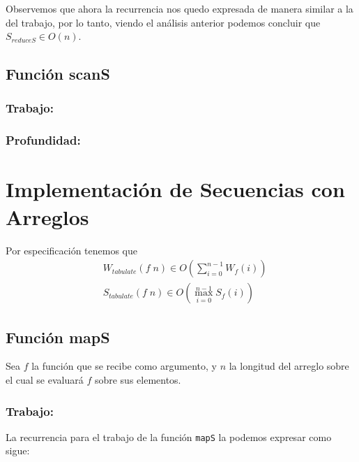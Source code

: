 \documentclass[11pt]{article}
\begin{document}
Observemos que ahora la recurrencia nos quedo expresada de manera similar
a la del trabajo, por lo tanto, viendo el análisis anterior podemos 
concluir que $S_{reduceS} \in O(n)$.


\subsection{Función scanS}
\subsubsection{Trabajo:}

\subsubsection{Profundidad:}


\section{Implementación de Secuencias con Arreglos}

Por especificación tenemos que
\begin{align*}
& W_{tabulate}(f \; n) \in O\left(\displaystyle\sum_{i=0}^{n - 1}W_f(i)\right) \\
& S_{tabulate}(f \; n) \in O\left(\displaystyle\max_{i=0}^{n - 1}S_f(i)\right)
\end{align*}

\subsection{Función mapS}

Sea $f$ la función que se recibe como argumento, y $n$ la longitud del arreglo
sobre el cual se evaluará $f$ sobre sus elementos.
\subsubsection{Trabajo:}
 
La recurrencia para el trabajo de la función \texttt{mapS} la podemos
expresar como sigue:
\end{document}
